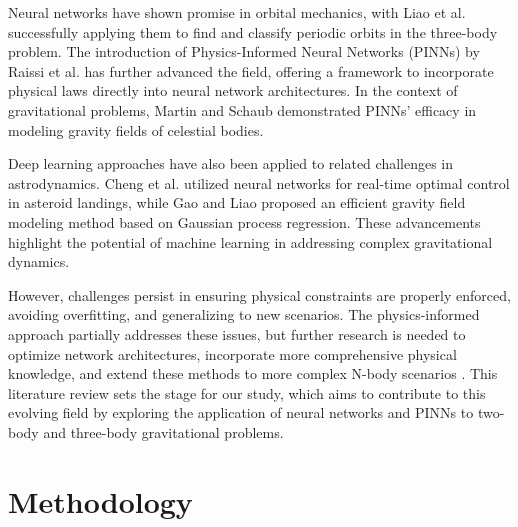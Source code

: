 \documentclass[12pt,a4paper]{article}
\begin{document}
Neural networks have shown promise in orbital mechanics, with Liao et al. \cite{liao2020} successfully applying them to find and classify periodic orbits in the three-body problem. The introduction of Physics-Informed Neural Networks (PINNs) by Raissi et al. \cite{raissi2019} has further advanced the field, offering a framework to incorporate physical laws directly into neural network architectures. In the context of gravitational problems, Martin and Schaub \cite{martin2022} demonstrated PINNs' efficacy in modeling gravity fields of celestial bodies.

Deep learning approaches have also been applied to related challenges in astrodynamics. Cheng et al. \cite{cheng2020} utilized neural networks for real-time optimal control in asteroid landings, while Gao and Liao \cite{gao2019} proposed an efficient gravity field modeling method based on Gaussian process regression. These advancements highlight the potential of machine learning in addressing complex gravitational dynamics.

However, challenges persist in ensuring physical constraints are properly enforced, avoiding overfitting, and generalizing to new scenarios. The physics-informed approach partially addresses these issues, but further research is needed to optimize network architectures, incorporate more comprehensive physical knowledge, and extend these methods to more complex N-body scenarios \cite{meng2022physics}. This literature review sets the stage for our study, which aims to contribute to this evolving field by exploring the application of neural networks and PINNs to two-body and three-body gravitational problems.
\section{Methodology}
\label{sec:methodology}
\end{document}
